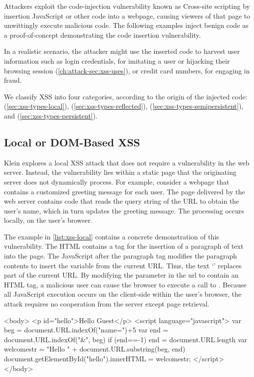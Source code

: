 Attackers exploit the code-injection vulnerability known as Cross-site scripting by insertion JavaScript or other code into a webpage, causing viewers of that page to unwittingly execute malicious code.
The following examples inject benign code as a proof-of-concept demonstrating the code insertion vulnerability.

In a realistic scenario, the attacker might use the inserted code to harvest user information such as login credentials, for imitating a user or hijacking their browsing session (\autoref{ch:attack-sec:xss-uses}), or credit card numbers, for engaging in fraud.

We classify XSS into four categories, according to the origin of the injected code:  (\autoref{sec:xss-types-local}),  (\autoref{sec:xss-types-reflected}),  (\autoref{sec:xss-types-semipersistent}), and  (\autoref{sec:xss-types-persistent}).

\subsection{Local or DOM-Based XSS}\label{sec:xss-types-local}

Klein \cite{localXSS} explores a local XSS attack that does not require a vulnerability in the web server.
Instead, the vulnerability lies within a static page that the originating server does not dynamically process.
For example, consider a webpage that contains a customized greeting message for each user.
The page delivered by the web server contains code that reads the query string of the URL to obtain the user's name, which in turn updates the greeting message.
The processing occurs locally, on the user's browser.

The example in \autoref{list:xss-local} contains a concrete demonstration of this vulnerability.
The HTML contains a  tag for the insertion of a paragraph of text into the page.
The JavaScript after the paragraph tag modifies the paragraph contents to insert the  variable from the current URL.
Thus, the text `' replaces part of the current URL.
By modifying the  parameter in the url to contain an HTML  tag, a malicious user can cause the browser to execute a call to .
Because all JavaScript execution occurs on the client-side within the user's browser, the attack requires no cooperation from the server except page retrieval.

\begin{jscode}
<body>
    <p id="hello">Hello Guest</p>
    <script language="javascript">
        var beg = document.URL.indexOf("name=")+5
        var end = document.URL.indexOf("\&", beg)
        if (end==-1) end = document.URL.length
        var welcomestr = "Hello " + document.URL.substring(beg, end)
        document.getElementById("hello").innerHTML = welcomestr;
    </script>
</body>
\end{jscode}

